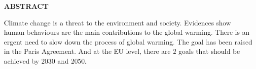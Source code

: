  \setcounter{page}{2}
\begin{center}
{\Large{\bf{ABSTRACT}}}
\end{center}

\noindent

Climate change is a threat to the environment and society. 
Evidences show human behaviours are the main contributions to the global warming. 
There is an ergent need to slow down the process of global warming. 
The goal has been raised in the Paris Agreement.
And at the EU level, there are 2 goals that should be achieved by 2030 and 2050.  

\clearpage